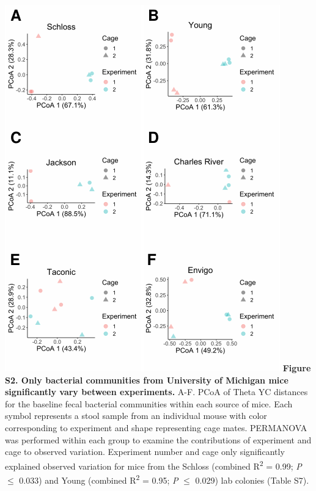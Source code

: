 \documentclass[11pt,]{article}
\begin{document}
\newpage

\includegraphics{figure_S2.pdf} \textbf{Figure S2. Only bacterial
communities from University of Michigan mice significantly vary between
experiments.} A-F. PCoA of Theta YC distances for the baseline fecal
bacterial communities within each source of mice. Each symbol represents
a stool sample from an individual mouse with color corresponding to
experiment and shape representing cage mates. PERMANOVA was performed
within each group to examine the contributions of experiment and cage to
observed variation. Experiment number and cage only significantly
explained observed variation for mice from the Schloss (combined
R\textsuperscript{2} = 0.99; \emph{P} \(\le\) 0.033) and Young (combined
R\textsuperscript{2} = 0.95; \emph{P} \(\le\) 0.029) lab colonies (Table
S7).

\newpage
\end{document}
